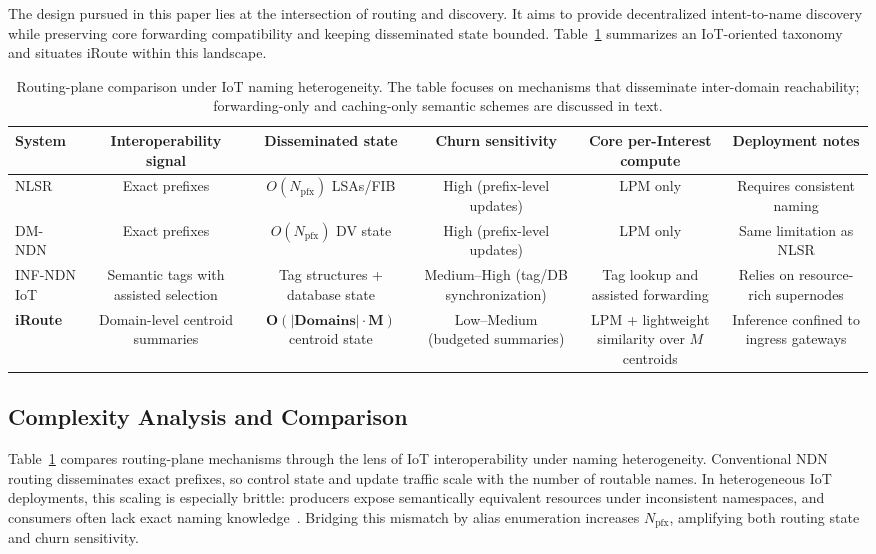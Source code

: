 \documentclass[journal]{IEEEtran}
\newcommand{\sysname}{iRoute}
\begin{document}
The design pursued in this paper lies at the intersection of routing and discovery.
It aims to provide decentralized intent-to-name discovery while preserving core forwarding compatibility and keeping disseminated state bounded.
Table~\ref{tab:complexity} summarizes an IoT-oriented taxonomy and situates \sysname{} within this landscape.

\begin{table}[t]
\centering
\caption{Routing-plane comparison under IoT naming heterogeneity. The table focuses on mechanisms that disseminate inter-domain reachability; forwarding-only and caching-only semantic schemes are discussed in text.}
\label{tab:complexity}
\footnotesize
\setlength{\tabcolsep}{4pt}
\renewcommand{\arraystretch}{1.2}
\begin{tabular*}{\textwidth}{@{\extracolsep{\fill}}lccccc@{}}
\toprule
\textbf{System} &
\textbf{Interoperability signal} &
\textbf{Disseminated state} &
\textbf{Churn sensitivity} &
\textbf{Core per-Interest compute} &
\textbf{Deployment notes}\\
\midrule
NLSR~\cite{nlsr} &
Exact prefixes &
$O(N_{\text{pfx}})$ LSAs/FIB &
High (prefix-level updates) &
LPM only &
Requires consistent naming\\
DM-NDN~\cite{distance_vector} &
Exact prefixes &
$O(N_{\text{pfx}})$ DV state &
High (prefix-level updates) &
LPM only &
Same limitation as NLSR\\
INF-NDN IoT~\cite{inf_ndn_iot} &
Semantic tags with assisted selection &
Tag structures + database state &
Medium--High (tag/DB synchronization) &
Tag lookup and assisted forwarding &
Relies on resource-rich supernodes\\
\midrule
\textbf{iRoute} &
Domain-level centroid summaries &
$\mathbf{O(|Domains|\cdot M)}$ centroid state &
Low--Medium (budgeted summaries) &
LPM + lightweight similarity over $M$ centroids &
Inference confined to ingress gateways\\
\bottomrule
\end{tabular*}
\end{table}

\subsection{Complexity Analysis and Comparison}
\label{sec:bg_complexity}

Table~\ref{tab:complexity} compares routing-plane mechanisms through the lens of IoT interoperability under naming heterogeneity.
Conventional NDN routing disseminates exact prefixes, so control state and update traffic scale with the number of routable names.
In heterogeneous IoT deployments, this scaling is especially brittle: producers expose semantically equivalent resources under inconsistent namespaces, and consumers often lack exact naming knowledge~\cite{amadeo2025saf,dt_vndn_semantic,grewe2018sodi}.
Bridging this mismatch by alias enumeration increases $N_{\text{pfx}}$, amplifying both routing state and churn sensitivity.
\end{document}
